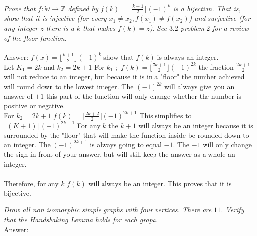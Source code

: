 \documentclass[12pt,letterpaper]{exam}
\begin{document}
\begin{questions}
\\






\question[3.5]
\emph{Prove that $f:\mathbb{W}\rightarrow \mathbb{Z}$ defined by $f(k)=\lfloor \frac{k+1}{2}\rfloor (-1)^k$ is a bijection. That is, show that it is injective (for every $x_1\neq x_2, f(x_1)\neq f(x_2)$) and surjective (for any integer $z$ there is a $k$ that makes $f(k)=z$). See $3.2$ problem $2$ for a review of the floor function.}
\\
\\
Answer: $f(x)= \lfloor \frac{k+1}{2}\rfloor (-1)^k$ show that $f(k)$ is always an integer.
\\
Let $K_1=2k$ and $k_2=2k+1$ For $k_1$ ;\ $f(k)= \lfloor \frac{2k+1}{2}\rfloor (-1)^{2k}$ the fraction $\frac{2k+1}{2}$ will not reduce to an integer, but because it is in a "floor" the number achieved will round down to the lowest integer. The $(-1)^{2k}$ will always give you an answer of $+1$ this part of the function will only change whether the number is positive or negative.
\\
For $k_2=2k+1$ \;  $f(k)= \lfloor \frac{2k+2}{2}\rfloor (-1)^{2k+1}$ This simplifies to $\lfloor(K+1)\rfloor(-1)^{2k+1}$ For any $k$ the $k+1$ will always be an integer because it is surrounded by the "floor" that will make the function inside be rounded down to an integer. The $(-1)^{2k+1}$ is always going to equal $-1$. The $-1$ will only change the sign in front of your answer, but will still keep the answer as a whole an integer.
\\
\\
Therefore, for any $k$ $f(k)$ will always be an integer. This proves that it is bijective.


\question[3.8]
\emph{Draw all non isomorphic simple graphs with four vertices. There are $11$. Verify that the Handshaking Lemma holds for each graph.}
\\
Answer:
\\


\end{questions}
\end{document}
